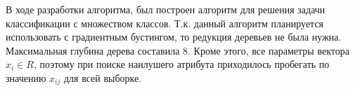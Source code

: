 В ходе разработки алгоритма, был построен алгоритм для решения задачи классификации с множеством классов. Т.к. данный алгоритм планируется использовать с градиентным бустингом, то редукция деревьев не была нужна. Максимальная глубина дерева составила 8. Кроме этого, все параметры вектора $x_i \in R$, поэтому при поиске наилушего атрибута приходилось пробегать по значению $x_{ij}$ для всей выборке. 

\newpage
